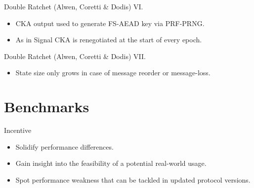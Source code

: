 \documentclass{beamer}
\begin{document}
\begin{frame}{Double Ratchet (Alwen, Coretti \& Dodis) VI.}
  \scriptsize
   \begin{minipage}[h]{0.49\textwidth}
      \begin{figure}[h]
        \centering
        \setlength{\fboxsep}{10pt}
        \scalebox{0.7}{%
        \fbox{%
          
        }
      }
    \end{figure}
    \end{minipage}
   \begin{minipage}[h]{0.49\textwidth}
      \begin{itemize}
      \item CKA output used to generate FS-AEAD key via PRF-PRNG.
      \item As in Signal CKA is renegotiated at the start of every epoch.
      \end{itemize}
  \end{minipage}
\end{frame}

\begin{frame}{Double Ratchet (Alwen, Coretti \& Dodis) VII.}
  \scriptsize
   \begin{minipage}[h]{0.49\textwidth}
      \begin{figure}[h]
        \centering
        \setlength{\fboxsep}{10pt}
        \scalebox{0.7}{%
        \fbox{%
          
        }
      }
    \end{figure}
    \end{minipage}
   \begin{minipage}[h]{0.49\textwidth}
      \begin{itemize}
      \item State size only grows in case of message reorder or message-loss.
      \end{itemize}
  \end{minipage}
\end{frame}

\section{Benchmarks}
\label{sec:benchmarks}

\begin{frame}{Incentive}
  \begin{itemize}
  \item Solidify performance differences.
  \item Gain insight into the feasibility of a potential real-world usage.
  \item Spot performance weakness that can be tackled in updated protocol
    versions.
  \end{itemize}
\end{frame}
\end{document}

